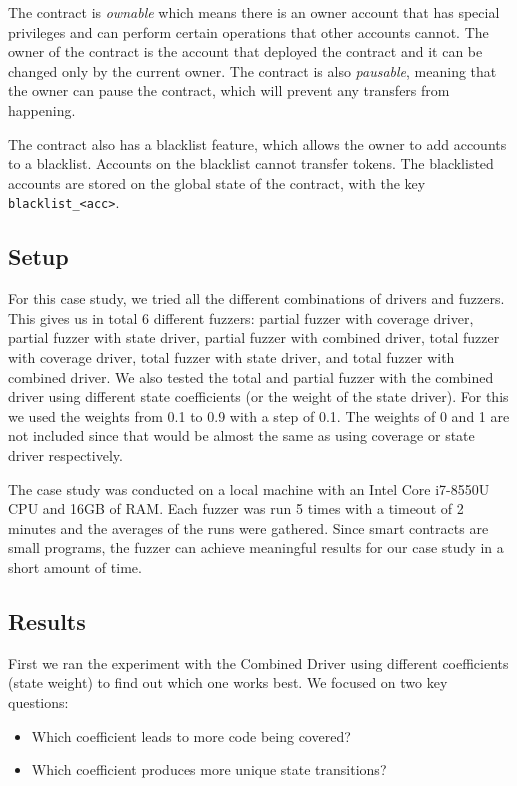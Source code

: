 The contract is \emph{ownable} which means there is an owner account that has special privileges and can perform certain operations that other accounts cannot.
The owner of the contract is the account that deployed the contract and it can be changed only by the current owner.
The contract is also \emph{pausable}, meaning that the owner can pause the contract, which will prevent any transfers from happening.

The contract also has a blacklist feature, which allows the owner to add accounts to a blacklist.
Accounts on the blacklist cannot transfer tokens.
The blacklisted accounts are stored on the global state of the contract, with the key \texttt{blacklist\_<acc>}.

\subsection*{Setup}
For this case study, we tried all the different combinations of drivers and fuzzers.
This gives us in total 6 different fuzzers: partial fuzzer with coverage driver, partial fuzzer with state driver, partial fuzzer with combined driver, total fuzzer with coverage driver, total fuzzer with state driver, and total fuzzer with combined driver.
We also tested the total and partial fuzzer with the combined driver using different state coefficients (or the weight of the state driver).
For this we used the weights from 0.1 to 0.9 with a step of 0.1.
The weights of 0 and 1 are not included since that would be almost the same as using coverage or state driver respectively.

The case study was conducted on a local machine with an Intel Core i7-8550U CPU and 16GB of RAM.
Each fuzzer was run 5 times with a timeout of 2 minutes and the averages of the runs were gathered.
Since smart contracts are small programs, the fuzzer can achieve meaningful results for our case study in a short amount of time.

\subsection*{Results}
First we ran the experiment with the Combined Driver using different coefficients (state weight) to find out which one works best. We focused on two key questions:
\begin{itemize}
    \item Which coefficient leads to more code being covered?
    \item Which coefficient produces more unique state transitions?
\end{itemize}

